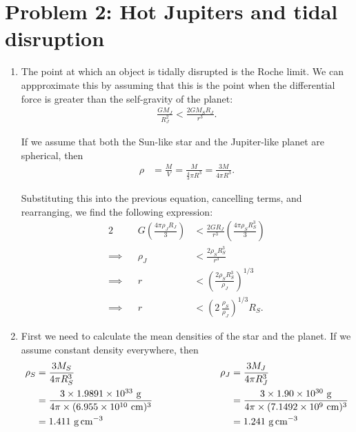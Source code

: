 \documentclass[11pt,letterpaper]{article}
\begin{document}
\section*{Problem 2: Hot Jupiters and tidal disruption}

\begin{enumerate}[label=(\alph*)]
    \item The point at which an object is tidally disrupted is the Roche limit. We can appproximate this by assuming that this is the point when the differential force is greater than the self-gravity of the planet: 
        \begin{align*}
            \frac{GM_J}{R_J^2} < \frac{2GM_SR_J}{r^3}.
        \end{align*}

        If we assume that both the Sun-like star and the Jupiter-like planet are spherical, then 
        \begin{align*}
            \rho &= \frac{M}{V} = \frac{M}{\frac{4}{3}\pi R^3} = \frac{3M}{4\pi R^3}.        \end{align*}

        Substituting this into the previous equation, cancelling terms, and rearranging, we find the following expression:
        \begin{alignat*}{2}
            &&G \left(\frac{4\pi\rho_J R_J}{3}\right) &<  \frac{2GR_J}{r^3}\left(\frac{4\pi\rho_S R_S^3}{3}\right) \\
            \implies&& \rho_J &< \frac{2\rho_S R_S^3}{r^3} \\
            \implies&& r &< \left(\frac{2\rho_S R_S^3}{\rho_J}\right)^{1/3} \\
            \implies&& r &< \left(2\,\frac{\rho_S}{\rho_J}\right)^{1/3} R_S.
        \end{alignat*}

    \item First we need to calculate the mean densities of the star and the planet. If we assume constant density everywhere, then 
        \begin{alignat*}{2}
            \rho_S &= \frac{3M_S}{4\pi R_S^3} &\qquad\qquad\qquad \rho_J &= \frac{3M_J}{4\pi R_J^3} \\
                   &= \frac{3\times 1.9891\times 10^{33}~{\rm g}}{4\pi\times (6.955\times 10^{10}~{\rm cm})^3} &&= \frac{3\times 1.90\times 10^{30}~{\rm g}}{4\pi\times (7.1492\times 10^{9}~{\rm cm})^3} \\
                   &= 1.411~{\rm g\,cm^{-3}} &&= 1.241~{\rm g\,cm^{-3}} 
        \end{alignat*}


\end{enumerate}
\end{document}
